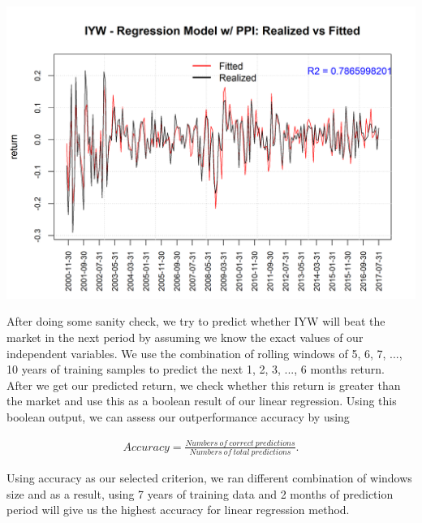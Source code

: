 \documentclass[12pt]{amsart}
\begin{document}
\begin{center}
	\includegraphics[scale=0.8]{IYW_linear_reg_withPPI}
\end{center}

After doing some sanity check, we try to predict whether IYW will beat the market in the next period by assuming we know the exact values of our independent variables. We use the combination of rolling windows of 5, 6, 7, ..., 10 years of training samples to predict the next 1, 2, 3, ..., 6 months return. \\
After we get our predicted return, we check whether this return is greater than the market and use this as a boolean result of our linear regression. Using this boolean output, we can assess our outperformance accuracy by using
 
\begin{align*}
Accuracy = \frac{Numbers\ of\ correct\ predictions}{Numbers\ of\ total\ predictions}.
\end{align*}

Using accuracy as our selected criterion, we ran different combination of windows size and as a result, using 7 years of training data and 2 months of prediction period will give us the highest accuracy for linear regression method.

\newpage
\end{document}
